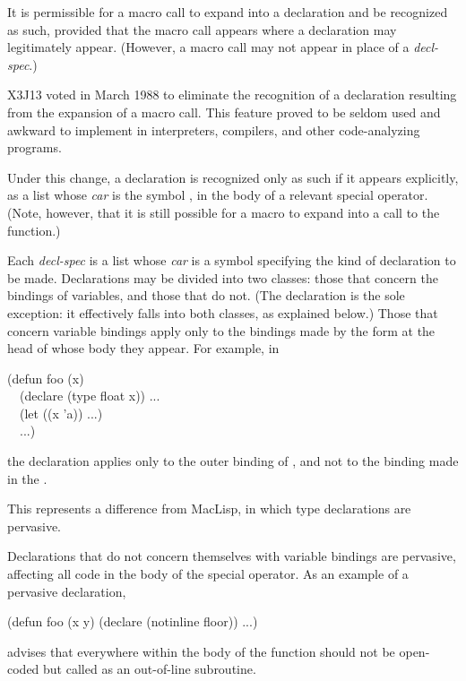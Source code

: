 \begin{defspec}
It is permissible for a macro call to expand into a declaration
and be recognized as such, provided that the macro call
appears where a declaration may legitimately appear.
(However, a macro call may not appear in place of a \emph{decl-spec}.)

\begin{new}
X3J13 voted in March 1988
to eliminate the recognition of
a declaration resulting from the expansion of a macro call.
This feature proved to be seldom used and
awkward to implement in interpreters, compilers, and other code-analyzing programs.

Under this change, a declaration is recognized only as such if
it appears explicitly, as a list whose \emph{car} is the symbol ,
in the body of a relevant special operator.  (Note, however, that it
is still possible for a macro to expand into a call to the 
function.)
\end{new}

Each \emph{decl-spec} is a list whose \emph{car} is a symbol
specifying the kind of declaration to be made.  Declarations may be
divided into two classes: those that concern the bindings of variables,
and those that do not. (The  declaration is the sole
exception: it effectively falls into both classes, as explained below.)
Those that concern variable bindings apply
only to the bindings made by the form at the head of whose body they
appear.  For example, in
\begin{lisp}
(defun foo (x) \\
~~(declare (type float x)) ... \\
~~(let ((x 'a)) ...) \\
~~...)
\end{lisp}
the  declaration applies only to the outer binding of ,
and not to the binding made in the .

\beforenoterule
\begin{incompatibility}
This represents a difference from MacLisp, in which type
declarations are pervasive.
\end{incompatibility}
\afternoterule

Declarations that do not concern themselves with variable bindings are
pervasive, affecting all code in the body of the special operator.
As an example of a pervasive declaration,
\begin{lisp}
(defun foo (x y) (declare (notinline floor)) ...)
\end{lisp}
advises that everywhere within the body of  the function
 should not be open-coded but called as an out-of-line subroutine.


\end{defspec}
